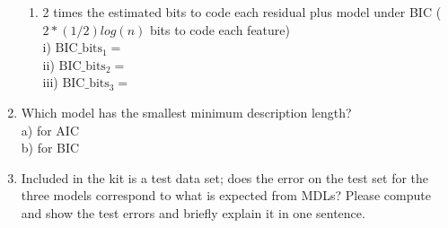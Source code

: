 \begin{enumerate}
\begin{enumerate}
\item 2 times the estimated bits to code each residual plus model under BIC  ($2*(1/2) log(n)$ bits to code each feature) \\
i)   $\text{BIC}\_\text{bits}_1 = $ \\
ii)  $\text{BIC}\_\text{bits}_2 = $ \\
iii) $\text{BIC}\_\text{bits}_3 = $ \\

\end{enumerate}


\item Which model has the smallest minimum description length? \\
a) for AIC \\
b) for BIC\\


\item  Included in the kit is a test data set; does the error on the test set for the three models
   correspond to what is expected from MDLs?  Please compute and show the test errors and briefly explain it in one sentence.


\end{enumerate}

